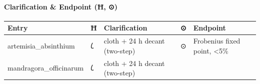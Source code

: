 \hypertarget{clarification-endpoint-ux127}{%
\paragraph{Clarification \& Endpoint (Ħ,
⊙)}\label{clarification-endpoint-ux127}}

\begin{longtable}[]{@{}lllll@{}}
\toprule
\begin{minipage}[b]{0.17\columnwidth}\raggedright
Entry\strut
\end{minipage} & \begin{minipage}[b]{0.17\columnwidth}\raggedright
Ħ\strut
\end{minipage} & \begin{minipage}[b]{0.17\columnwidth}\raggedright
Clarification\strut
\end{minipage} & \begin{minipage}[b]{0.17\columnwidth}\raggedright
⊙\strut
\end{minipage} & \begin{minipage}[b]{0.17\columnwidth}\raggedright
Endpoint\strut
\end{minipage}\tabularnewline
\midrule
\endhead
\begin{minipage}[t]{0.17\columnwidth}\raggedright
artemisia\_absinthium\strut
\end{minipage} & \begin{minipage}[t]{0.17\columnwidth}\raggedright
𐑖\strut
\end{minipage} & \begin{minipage}[t]{0.17\columnwidth}\raggedright
cloth + 24 h decant (two-step)\strut
\end{minipage} & \begin{minipage}[t]{0.17\columnwidth}\raggedright
⊙\strut
\end{minipage} & \begin{minipage}[t]{0.17\columnwidth}\raggedright
Frobenius fixed point, \textless5\%\strut
\end{minipage}\tabularnewline
\begin{minipage}[t]{0.17\columnwidth}\raggedright
mandragora\_officinarum\strut
\end{minipage} & \begin{minipage}[t]{0.17\columnwidth}\raggedright
𐑖\strut
\end{minipage} & \begin{minipage}[t]{0.17\columnwidth}\raggedright
cloth + 24 h decant (two-step)\strut
\end{minipage} & \begin{minipage}[t]{0.17\columnwidth}\raggedright

\end{minipage}
\end{longtable}
